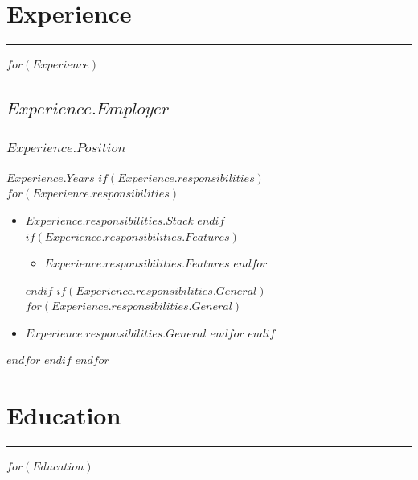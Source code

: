\documentclass[$fontsize$, a4paper]{article}
\begin{document}
    \begin{adjustwidth}{5pt}{5pt}
        \begin{multicols*}{2}
        \section*{Experience}\raggedbottom
        \textcolor{RoyalBlue}{\noindent\rule{\linewidth}{1pt}}
        \begin{itemize}
        $for(Experience)$
            {\item \subsection*{$Experience.Employer$}}
            \subsubsection*{$Experience.Position$}
            {$Experience.Years$}
            $if(Experience.responsibilities)$
                $for(Experience.responsibilities)$
                    \begin{itemize} 
                        $if(Experience.responsibilities.Stack)$
                            \item $Experience.responsibilities.Stack$
                        $endif$
                        $if(Experience.responsibilities.Features)$
                            \begin{itemize} 
                                $for(Experience.responsibilities.Features)$
                                    \item $Experience.responsibilities.Features$
                                $endfor$
                            \end{itemize}
                        $endif$
                        $if(Experience.responsibilities.General)$
                            $for(Experience.responsibilities.General)$
                               \item $Experience.responsibilities.General$
                            $endfor$
                        $endif$
                    \end{itemize}
                $endfor$
            $endif$
        $endfor$
        
        \vfill
        \end{itemize}  
        \vfill
        \columnbreak
        \section*{Education}
        \textcolor{RoyalBlue}{\noindent\rule{\linewidth}{1pt}}
            $for(Education)$

\end{multicols*}
\end{adjustwidth}
\end{document}
